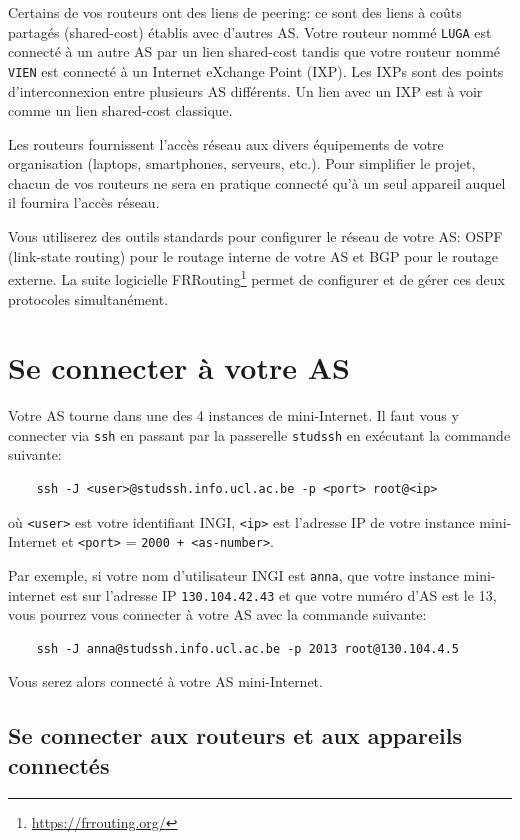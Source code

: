 \documentclass[a4paper, 11pt]{article}
\begin{document}
Certains de vos routeurs ont des liens de peering: ce sont
des liens à coûts partagés (shared-cost) établis avec d'autres AS.
Votre routeur nommé \texttt{LUGA} est connecté à un autre AS par un
lien shared-cost tandis que votre routeur nommé \texttt{VIEN} est
connecté à un Internet eXchange Point (IXP). Les IXPs sont des points
d'interconnexion entre plusieurs AS différents. Un lien avec un IXP
est à voir comme un lien shared-cost classique.

Les routeurs fournissent l'accès réseau aux divers équipements de votre
organisation (laptops, smartphones, serveurs, etc.). Pour simplifier
le projet, chacun de vos routeurs ne sera en pratique connecté qu'à un
seul appareil auquel il fournira l'accès réseau.

Vous utiliserez des outils standards pour configurer le réseau de votre
AS: OSPF (link-state routing) pour le routage interne de votre AS et
BGP pour le routage externe. La suite logicielle
FRRouting\footnote{\url{https://frrouting.org/}} permet de configurer
et de gérer ces deux protocoles simultanément.


\section{Se connecter à votre AS}

Votre AS tourne dans une des 4 instances de mini-Internet. Il
faut vous y connecter via \texttt{ssh} en passant par la passerelle
\texttt{studssh} en exécutant la commande suivante:
\begin{verbatim}
    ssh -J <user>@studssh.info.ucl.ac.be -p <port> root@<ip>
\end{verbatim}
où \texttt{<user>} est votre identifiant INGI, \texttt{<ip>} est
l'adresse IP de votre instance mini-Internet et \texttt{<port>}
= \texttt{2000 + <as-number>}.

Par exemple, si votre nom d'utilisateur INGI est \texttt{anna},
que votre instance mini-internet est sur l'adresse IP
\texttt{130.104.42.43} et que votre numéro d'AS est le 13,
vous pourrez vous connecter à votre AS avec la commande suivante:

\begin{verbatim}
    ssh -J anna@studssh.info.ucl.ac.be -p 2013 root@130.104.4.5
\end{verbatim}

Vous serez alors connecté à votre AS mini-Internet.

\subsection{Se connecter aux routeurs et aux appareils connectés}
\end{document}
